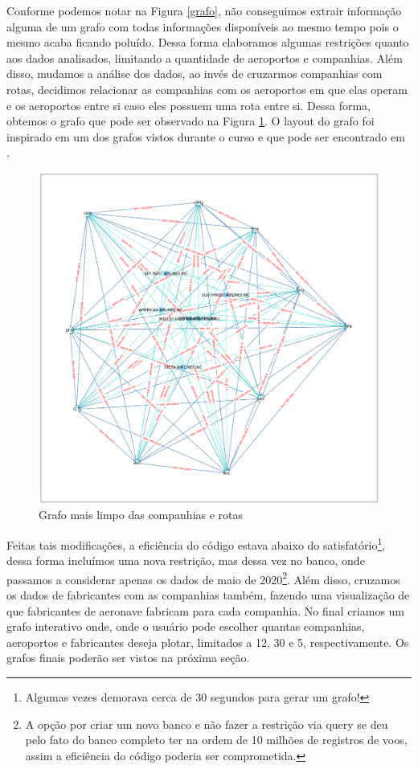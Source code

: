 \documentclass{article}
\begin{document}
Conforme podemos notar na Figura \ref{grafo}, não conseguimos extrair informação alguma de um grafo com todas informações disponíveis ao mesmo tempo pois o mesmo acaba ficando poluído. Dessa forma elaboramos algumas restrições quanto aos dados analisados, limitando a quantidade de aeroportos e companhias. Além disso, mudamos a análise dos dados, ao invés de cruzarmos companhias com rotas, decidimos relacionar as companhias com os aeroportos em que elas operam e os aeroportos entre si caso eles possuem uma rota entre si. Dessa forma, obtemos o grafo que pode ser observado na Figura \ref{preview}. O layout do grafo foi inspirado em um dos grafos vistos durante o curso e que pode ser encontrado em \cite{github3}.
\begin{figure}
    \centering
    \includegraphics[width = \textwidth]{Imagens/preview.png}
    \caption{Grafo mais limpo das companhias e rotas}
    \label{preview}
\end{figure}

Feitas tais modificações, a eficiência do código estava abaixo do satisfatório\footnote{Algumas vezes demorava cerca de 30 segundos para gerar um grafo!}, dessa forma incluímos uma nova restrição, mas dessa vez no banco, onde passamos a considerar apenas os dados de maio de 2020\footnote{A opção por criar um novo banco e não fazer a restrição via query se deu pelo fato do banco completo ter na ordem de 10 milhões de registros de voos, assim a eficiência do código poderia ser comprometida.}. Além disso, cruzamos os dados de fabricantes com as companhias também, fazendo uma visualização de que fabricantes de aeronave fabricam para cada companhia. No final criamos um grafo interativo onde, onde o usuário pode escolher quantas companhias, aeroportos e fabricantes deseja plotar, limitados a 12, 30 e 5, respectivamente. Os grafos finais poderão ser vistos na próxima seção.
\end{document}
